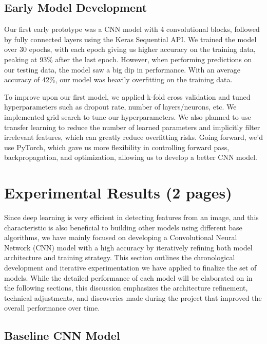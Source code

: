 \documentclass[conference]{IEEEtran}
\begin{document}
\subsection{\large Early Model Development}

Our first early prototype was a CNN model with 4 convolutional blocks, followed by fully connected layers using the Keras Sequential API. We trained the model over 30 epochs, with each epoch giving us higher accuracy on the training data, peaking at 93\% after the last epoch. However, when performing predictions on our testing data, the model saw a big dip in performance. With an average accuracy of 42\%, our model was heavily overfitting on the training data.

To improve upon our first model, we applied k-fold cross validation and tuned hyperparameters such as dropout rate, number of layers/neurons, etc. We implemented grid search to tune our hyperparameters. We also planned to use transfer learning to reduce the number of learned parameters and implicitly filter irrelevant features, which can greatly reduce overfitting risks. Going forward, we'd use PyTorch, which gave us more flexibility in controlling forward pass, backpropagation, and optimization, allowing us to develop a better CNN model.

\section{\large Experimental Results (2 pages)}

Since deep learning is very efficient in detecting features from an image, and this characteristic is also beneficial to building other models using different base algorithms, we have mainly focused on developing a Convolutional Neural Network (CNN) model with a high accuracy by iteratively refining both model architecture and training strategy. This section outlines the chronological development and iterative experimentation we have applied to finalize the set of models. While the detailed performance of each model will be elaborated on in the following sections, this discussion emphasizes the architecture refinement, technical adjustments, and discoveries made during the project that improved the overall performance over time.

\subsection{\large Baseline CNN Model}
\end{document}
